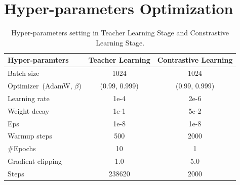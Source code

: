 \section{Hyper-parameters Optimization}
\begin{table}[htb]
\small
\centering
\begin{tabular}{l|cc} 
\toprule
\multicolumn{1}{l}{\small{Hyper-paramters}} & \small{Teacher Learning}                             & \small{Contrastive Learning }                                  \\ 
\hline\hline
Batch size                          & 1024                                         & 1024                                          \\
Optimizer~(AdamW, $\beta$)  & (0.99, 0.999) & (0.99, 0.999)  \\
Learning rate                       & 1e-4                                         & 2e-6                                          \\
Weight decay                        & 1e-1                                         & 5e-2                                          \\
Eps                                 & 1e-8                                         & 1e-8                                          \\
Warmup steps                        & 500                                          & 2000                                          \\
\#Epochs                             & 10                                           & 1                                             \\
Gradient clipping                   & 1.0                                          & 5.0                                           \\
Steps                               & 238620                                       & 2000                                             \\
\bottomrule
\end{tabular}
\caption{Hyper-parameters setting in Teacher Learning Stage and Constrastive Learning Stage.\label{tab:ccl}}
\label{tab:hyper}
\end{table}
